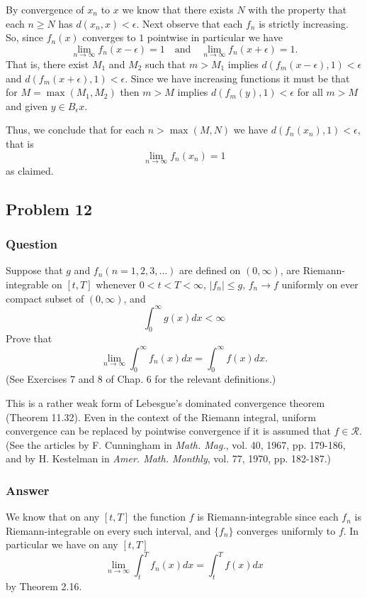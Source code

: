 \documentclass[12pt]{article}
\begin{document}
By convergence of $x_n$ to $x$ we know that there exists $N$ with the property that each $n \geq N $ has $d(x_n, x) < \epsilon$. Next observe that  each $f_n$ is strictly increasing. So, since $f_n(x)$ converges to $1$ pointwise in particular we have 
\[\lim_{n \to \infty} f_n(x - \epsilon) = 1 \quad \mathrm{and} \quad \lim_{n \to \infty} f_n(x + \epsilon) = 1 .\]
That is, there exist $M_1$ and $M_2$ such that $m > M_1$ implies $d(f_m(x-\epsilon),1) < \epsilon$ and $d(f_m(x+\epsilon),1) < \epsilon$. Since we have increasing functions  it must be that for $M = \max{(M_1,M_2)}$ then $m>M$ implies $d(f_m(y),1) < \epsilon$ for all $m > M$ and given $y \in B_\epsilon x$.

Thus, we conclude that  for each $n > \max{(M,N)}$ we have $d(f_n(x_n),1) < \epsilon$, that is
\[\lim_{n \to \infty} f_n(x_n) = 1\]
as claimed.


\subsection{Problem 12}

\subsubsection{Question}
Suppose that $g$ and $f_n(n=1,2,3,\dots)$ are defined on $(0,\infty)$, are Riemann-integrable on $[t,T]$ whenever $0<t<T<\infty$, $|f_n|\leq g$, $f_n \to f$ uniformly on ever compact subset of $(0, \infty)$, and
\[\int_0^\infty g(x) dx < \infty\]
Prove that
\[\lim_{n \to \infty} \int_0^\infty f_n(x) dx = \int_0^\infty f(x) dx.\]
(See Exercises 7 and 8 of Chap. 6 for the relevant definitions.)

This is a rather weak form of Lebesgue's dominated convergence theorem (Theorem 11.32). Even in the context of the Riemann integral, uniform convergence can be replaced by pointwise convergence if it is assumed that $f \in \mathcal{R}$. (See the articles by F. Cunningham in \emph{Math. Mag.}, vol. 40, 1967, pp. 179-186, and by H. Kestelman in \emph{Amer. Math. Monthly}, vol. 77, 1970, pp. 182-187.)
\subsubsection{Answer}
We know that on any $[t,T]$ the function $f$ is Riemann-integrable since each $f_n$ is Riemann-integrable on every such interval, and $\{f_n\}$ converges uniformly to $f$. In particular we have on any $[t,T]$ 
\[ \lim_{n \to \infty} \int_t^T f_n(x) dx = \int_t^T f(x) dx\]
by Theorem 2.16.
\end{document}
